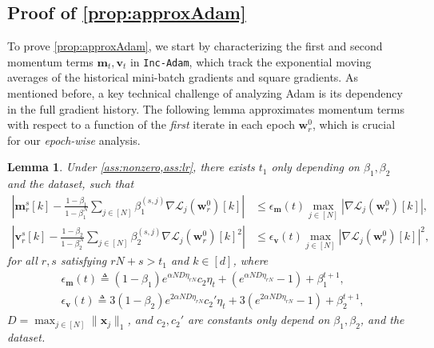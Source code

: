 \documentclass{article} %
\theoremstyle{plain}
\newtheorem{lemma}[theorem]{Lemma}
\theoremstyle{definition}
\theoremstyle{remark}
\def\bigabs#1{\left|#1\right|}
\newcommand{\Ls}{\mathcal{L}}
\def\bm{{\mathbf m}}
\def\bx{{\mathbf x}}
\def\bw{{\mathbf w}}
\def\bv{{\mathbf v}}
\begin{document}
\subsection[Proof of Proposition \ref{prop:approxAdam}]{Proof of \cref{prop:approxAdam}}
To prove \cref{prop:approxAdam}, we start by characterizing the first and second momentum terms $\bm_t, \bv_t$ in \texttt{Inc-Adam}, which track the exponential moving averages of the historical mini-batch gradients and square gradients. As mentioned before, a key technical challenge of analyzing Adam is its dependency in the full gradient history. The following lemma approximates momentum terms with respect to a function of the \textit{first} iterate in each epoch $\bw_r^0$, which is crucial for our \textit{epoch-wise} analysis.

\begin{lemma}\label{lemma:approx_momentums}
    Under \cref{ass:nonzero,ass:lr}, there exists $t_1$ only depending on $\beta_1, \beta_2$ and the dataset, such that
    \begin{align*}
        \bigabs{\bm_r^s[k]-\frac{1-\beta_1}{1-\beta_1^N}\sum_{j \in [N]}\beta_1^{(s, j)}\nabla\Ls_{j}(\bw_r^0)[k]}
        &\leq \epsilon_\bm(t)\max_{j \in [N]}\bigabs{\nabla \Ls_j(\bw_r^0)[k]}, \\
        \bigabs{\bv_r^s[k]-\frac{1-\beta_2}{1-\beta_2^N}\sum_{j \in [N]}\beta_2^{(s, j)}\nabla\Ls_{j}(\bw_r^0)[k]^2}
        &\leq \epsilon_\bv(t)\max_{j \in [N]}\bigabs{\nabla \Ls_j(\bw_r^0)[k]}^2,
    \end{align*}
    for all $r,s$ satisfying $rN+s>t_1$ and $k \in [d]$, where 
    \begin{align*}
        &\epsilon_\bm(t) \triangleq (1-\beta_1)e^{\alpha ND \eta_{rN}}c_2\eta_t+(e^{\alpha ND \eta_{rN}}-1)+\beta_1^{t+1},\\
        &\epsilon_\bv(t) \triangleq 3(1-\beta_2)e^{2\alpha ND \eta_{rN}}c_2'\eta_t+3(e^{2\alpha ND \eta_{rN}}-1)+\beta_2^{t+1},
    \end{align*}
    $D = \max_{j\in[N]} \|\bx_j\|_1$, and $c_2, c_2'$ are constants only depend on $\beta_1, \beta_2$, and the dataset.
\end{lemma}
\end{document}
